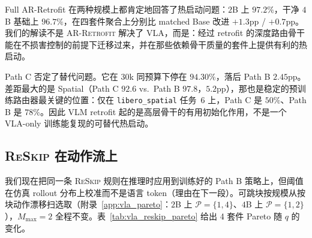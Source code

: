 \documentclass{article}
\newcommand{\reskip}{\textsc{ReSkip}}
\newcommand{\retrofit}{\textsc{AR-Retrofit}}
\begin{document}
Full AR-Retrofit 在两种规模上都肯定地回答了热启动问题：$2$B 上 $97.2\%$，干净 $4$B 基础上 $96.7\%$，在四套件聚合上分别比 matched Base 改进 $+1.3$pp / $+0.7$pp。我们的解读不是 \retrofit{} 解决了 VLA，而是：经过 retrofit 的深度路由骨干能在不损害控制的前提下迁移过来，并在那些依赖骨干质量的套件上提供有利的热启动。

Path C 否定了替代问题。它在 $30$k 同预算下停在 $94.30\%$，落后 Path B $2.45$pp。差距最大的是 Spatial（Path C $92.6$ vs.\ Path B $97.8$，$5.2$pp），那也是稳定的预训练路由器最关键的位置：仅在 \texttt{libero\_spatial} 任务~$6$ 上，Path C 是 $50\%$、Path B 是 $78\%$。因此 VLM retrofit 起的是高层骨干的有用初始化作用，不是一个 VLA-only 训练能复现的可替代热启动。

\subsection{\reskip{} 在动作流上}
\label{sec:vla_reskip}

我们现在把同一条 \reskip{} 规则在推理时应用到训练好的 Path B 策略上，但阈值在仿真 rollout 分布上校准而不是语言 token（理由在下一段）。可跳块按规模从按块动作漂移扫选取（附录~\ref{app:vla_pareto}：$2$B 上 $\mathcal{P}{=}\{1,4\}$、$4$B 上 $\mathcal{P}{=}\{1,2\}$），$M_{\max}{=}2$ 全程不变。表~\ref{tab:vla_reskip_pareto} 给出 4 套件 Pareto 随 $q$ 的变化。
\end{document}
